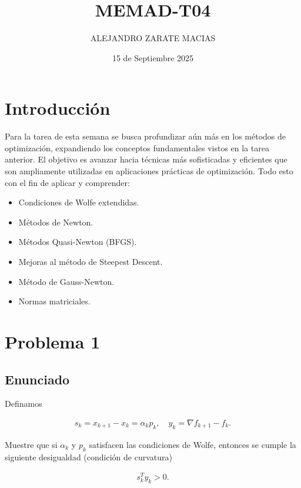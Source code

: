 \documentclass{article}
\title{MEMAD-T04}
\author{ALEJANDRO ZARATE MACIAS}
\date{15 de Septiembre 2025}
\begin{document}
\maketitle

\section*{Introducción}

Para la tarea de esta semana se busca profundizar aún más en los métodos de optimización, expandiendo los conceptos fundamentales vistos en la tarea anterior. El objetivo es avanzar hacia técnicas más sofisticadas y eficientes que son ampliamente utilizadas en aplicaciones prácticas de optimización. Todo esto con el fin de aplicar y comprender:

\begin{itemize}
    \item Condiciones de Wolfe extendidas.
    \item Métodos de Newton.
    \item Métodos Quasi-Newton (BFGS).
    \item Mejoras al método de Steepest Descent.
    \item Método de Gauss-Newton.
    \item Normas matriciales.
\end{itemize}

\section{Problema 1}

\subsection{Enunciado}

Definamos 

\begin{align*}
    s_k = x_{k+1} - x_k = \alpha_k p_k, \quad y_k = \nabla f_{k+1} - f_k.
\end{align*}

Muestre que si $\alpha_k$ y $p_k$ satisfacen las condiciones de Wolfe, entonces se cumple la siguiente desigualdad (condición de curvatura)

\begin{align}
    s_k^Ty_k > 0. 
\end{align}
\end{document}
